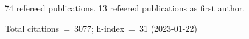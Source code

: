 74 refereed publications. 13 refeered publications as first author.

Total citations~=~3077; h-index~=~31 (2023-01-22)